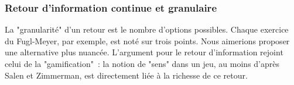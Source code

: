     \subsubsection{Retour d'information continue et granulaire}
    La "granularité" d'un retour est le nombre d'options possibles. 
    Chaque exercice du Fugl-Meyer, par exemple, est noté sur trois points. Nous 
    aimerions proposer une alternative plus nuancée.
    L'argument pour le retour d'information rejoint celui de la "gamification"~:
    la notion de "sens" dans un jeu, au moins d'après Salen et Zimmerman, est 
    directement liée à la richesse de ce retour.
